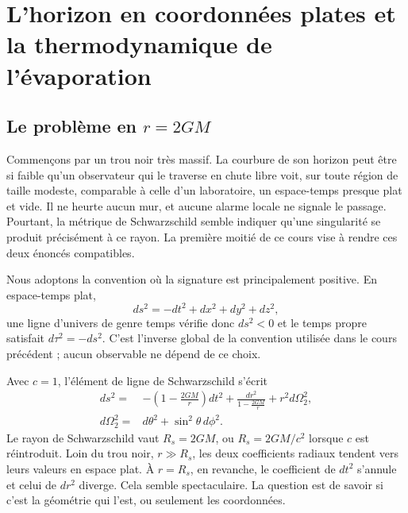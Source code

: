\chapter{L’horizon en coordonnées plates et la thermodynamique de l’évaporation}


\section{Le problème en \texorpdfstring{\(r=2GM\)}{r=2GM}}

Commençons par un trou noir très massif. La courbure de son horizon peut être si faible qu’un observateur qui le traverse en chute libre voit, sur toute région de taille modeste, comparable à celle d’un laboratoire, un espace-temps presque plat et vide. Il ne heurte aucun mur, et aucune alarme locale ne signale le passage. Pourtant, la métrique de Schwarzschild semble indiquer qu’une singularité se produit précisément à ce rayon. La première moitié de ce cours vise à rendre ces deux énoncés compatibles.

Nous adoptons la convention où la signature est principalement positive. En espace-temps plat,
\begin{equation}
ds^2=-dt^2+dx^2+dy^2+dz^2,
\end{equation}
une ligne d’univers de genre temps vérifie donc \(ds^2<0\) et le temps propre satisfait \(d\tau^2=-ds^2\). C’est l’inverse global de la convention utilisée dans le cours précédent ; aucun observable ne dépend de ce choix.

Avec \(c=1\), l’élément de ligne de Schwarzschild s’écrit
\begin{equation}
\begin{aligned}
ds^2={}&-\left(1-\frac{2GM}{r}\right)dt^2
+\frac{dr^2}{1-\frac{2GM}{r}}
+r^2d\Omega_2^2,\\
d\Omega_2^2={}&d\theta^2+\sin^2\theta\,d\phi^2 .
\end{aligned}
\label{eq:l03-schwarzschild}
\end{equation}
Le rayon de Schwarzschild vaut \(R_s=2GM\), ou \(R_s=2GM/c^2\) lorsque \(c\) est réintroduit. Loin du trou noir, \(r\gg R_s\), les deux coefficients radiaux tendent vers leurs valeurs en espace plat. À \(r=R_s\), en revanche, le coefficient de \(dt^2\) s’annule et celui de \(dr^2\) diverge. Cela semble spectaculaire. La question est de savoir si c’est la géométrie qui l’est, ou seulement les coordonnées.


